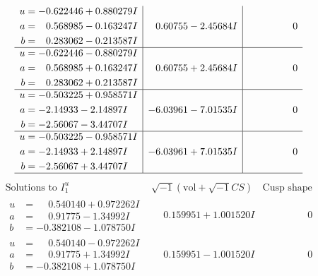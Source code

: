 \documentclass[1p]{elsarticle_modified}
\theoremstyle{definition}
\newcommand{\I}{\sqrt{-1}}
\begin{document}
$$\begin{array}{c|c|c}
\begin{aligned}
u &= -0.622446 + 0.880279 I \\
a &= \phantom{-}0.568985 - 0.163247 I \\
b &= \phantom{-}0.283062 - 0.213587 I\end{aligned}
 & \phantom{-}0.60755 - 2.45684 I & \phantom{-0.000000 } 0 \\ \hline\begin{aligned}
u &= -0.622446 - 0.880279 I \\
a &= \phantom{-}0.568985 + 0.163247 I \\
b &= \phantom{-}0.283062 + 0.213587 I\end{aligned}
 & \phantom{-}0.60755 + 2.45684 I & \phantom{-0.000000 } 0 \\ \hline\begin{aligned}
u &= -0.503225 + 0.958571 I \\
a &= -2.14933 - 2.14897 I \\
b &= -2.56067 - 3.44707 I\end{aligned}
 & -6.03961 - 7.01535 I & \phantom{-0.000000 } 0 \\ \hline\begin{aligned}
u &= -0.503225 - 0.958571 I \\
a &= -2.14933 + 2.14897 I \\
b &= -2.56067 + 3.44707 I\end{aligned}
 & -6.03961 + 7.01535 I & \phantom{-0.000000 } 0\\
 \hline 
 \end{array}$$\newpage$$\begin{array}{c|c|c}  
\text{Solutions to }I^u_{1}& \I (\text{vol} + \sqrt{-1}CS) & \text{Cusp shape}\\
 \hline 
\begin{aligned}
u &= \phantom{-}0.540140 + 0.972262 I \\
a &= \phantom{-}0.91775 - 1.34992 I \\
b &= -0.382108 - 1.078750 I\end{aligned}
 & \phantom{-}0.159951 + 1.001520 I & \phantom{-0.000000 } 0 \\ \hline\begin{aligned}
u &= \phantom{-}0.540140 - 0.972262 I \\
a &= \phantom{-}0.91775 + 1.34992 I \\
b &= -0.382108 + 1.078750 I\end{aligned}
 & \phantom{-}0.159951 - 1.001520 I & \phantom{-0.000000 } 0 \\ \hline\begin{aligned}

\end{aligned}
\end{array}$$
\end{document}
